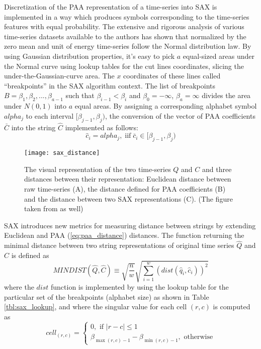 Discretization of the PAA representation of a time-series into SAX is implemented in a way which produces symbols corresponding to the time-series features with equal probability. The extensive and rigorous analysis of various time-series datasets available to the authors has shown that normalized by the zero mean and unit of energy time-series follow the Normal distribution law. By using Gaussian distribution properties, it's easy to pick $a$ equal-sized areas under the Normal curve using  lookup tables  \cite{citeulike:4434481} for the cut lines coordinates, slicing the under-the-Gaussian-curve area. 
The $x$ coordinates of these lines called ``breakpoints'' in the SAX algorithm context. The list of breakpoints $B=\beta_{1}, \beta_{2}, ... , \beta_{a-1}$ such that $\beta_{i-1} < \beta_{i}$ and $\beta_{0} = -\infty$, $\beta_{a} = \infty$ divides the area under $N(0,1)$ into $a$ equal areas. By assigning a corresponding alphabet symbol $alpha_{j}$ to each interval $[\beta_{j-1},\beta_{j})$, the conversion of the vector of PAA coefficients $\bar{C}$ into the string $\hat{C}$ implemented as follows:
\begin{equation}
\hat{c}_{i} = alpha_{j}, \; \text{iif} \; \bar{c}_{i} \in [\beta_{j-1},\beta_{j})
\label{eq:alpha}
\end{equation}

\begin{figure}[tbp]
   \centering
   \texttt{[image: sax\_distance]}
   \caption{The visual representation of the two time-series $Q$ and $C$ and three distances between their representation: Euclidean distance between raw time-series (A), the distance defined for PAA coefficients (B) and the distance between two SAX representations (C). (The figure taken from \cite{citeulike:2821475} as well)}
   \label{fig:sax_distance}
\end{figure}

SAX introduces new metrics for measuring distance between strings by extending Euclidean and PAA (\ref{eq:paa_distance}) distances. The function returning the minimal distance between two string representations of original time series $\hat{Q}$ and $\hat{C}$ is defined as
\begin{equation}
MINDIST(\hat{Q},\hat{C}) \equiv \sqrt{ \frac{n}{w} } \sqrt{ \sum_{i=1}^{w} ( dist( \hat{q}_{i}, \hat{c}_{i} ) )^{2}}
\label{eq:sax_mindist}
\end{equation} 
where the $dist$ function is implemented by using the lookup table for the particular set of the breakpoints (alphabet size) as shown in Table \ref{tbl:sax_lookup}, and where the singular value for each cell $(r,c)$ is computed as 
\begin{equation}
cell_{(r,c)} = 
\begin{cases} 
0, \text{ if }\left| r-c \right| \leq 1 \\
\beta_{\max(r,c) - 1} - \beta_{\min(r,c) - 1}, \text{ otherwise}
\end{cases}
\label{eq:cell}
\end{equation}

